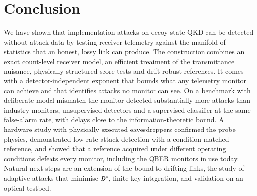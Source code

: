 \section{Conclusion}\label{sec:conclusion}

We have shown that implementation attacks on decoy-state QKD can be detected without attack data by testing receiver telemetry against the manifold of statistics that an honest, lossy link can produce. The construction combines an exact count-level receiver model, an efficient treatment of the transmittance nuisance, physically structured score tests and drift-robust references. It comes with a detector-independent exponent that bounds what any telemetry monitor can achieve and that identifies attacks no monitor can see. On a benchmark with deliberate model mismatch the monitor detected substantially more attacks than industry monitors, unsupervised detectors and a supervised classifier at the same false-alarm rate, with delays close to the information-theoretic bound. A hardware study with physically executed eavesdroppers confirmed the probe physics, demonstrated low-rate attack detection with a condition-matched reference, and showed that a reference acquired under different operating conditions defeats every monitor, including the QBER monitors in use today. Natural next steps are an extension of the bound to drifting links, the study of adaptive attacks that minimise $D^{\ast}$, finite-key integration, and validation on an optical testbed.
